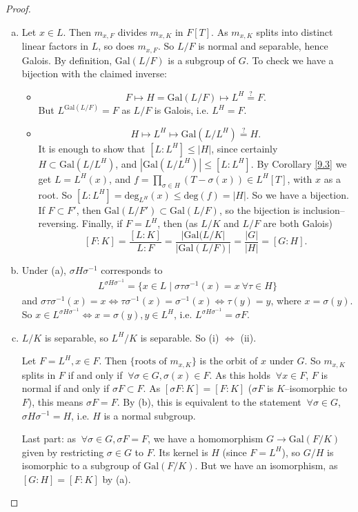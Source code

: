 \documentclass{article}
\theoremstyle{definition}
\begin{document}
\begin{proof}
    \begin{enumerate}[(a)]
        \item Let $x \in L$. Then $m_{x,F}$ divides $m_{x,K}$ in $F[T]$. As $m_{x,K}$ splits into distinct linear factors in $L$, so does $m_{x,F}$. So $L/F$ is normal and separable, hence Galois. By definition, $\text{Gal}(L/F)$ is a subgroup of $G$. To check we have a bijection with the claimed inverse:
        \begin{itemize}
            \item $$F \mapsto H = \text{Gal}(L/F) \mapsto L^H \stackrel{?}{=} F.$$
            But $L^{\text{Gal}(L/F)}=F$ as $L/F$ is Galois, i.e. $L^H = F$.
            \item $$H \mapsto L^H \mapsto \text{Gal}(L/L^H) \stackrel{?}{=} H.$$
            It is enough to show that $[L:L^H] \le |H|$, since certainly $H \subset \text{Gal}(L/L^H)$, and $|\text{Gal}(L/L^H)| \le [L : L^H]$. By Corollary \ref{9.3} we get $L=L^H(x)$, and $f = \prod_{\sigma \in H}^{} (T-\sigma(x)) \in L^H[T]$, with $x$ as a root. So $[L : L^H] = \text{deg}_{L^H}(x) \le \text{deg}(f) = |H|$. So we have a bijection. If $F \subset F'$, then $\text{Gal}(L/F') \subset \text{Gal}(L/F)$, so the bijection is inclusion--reversing. Finally, if $F=L^H$, then (as $L/K$ and $L/F$ are both Galois) \[
            [F:K] = \frac{[L:K]}{L:F} = \frac{|\text{Gal}(L/K|}{|\text{Gal}(L/F)|} = \frac{|G|}{|H|} = [G:H].
            \]
        \end{itemize}
        \item Under (a), $\sigma H \sigma^{-1}$ corresponds to 
        \begin{align*}
            L^{\sigma H \sigma^{-1}} = \{x \in L \mid \sigma \tau \sigma^{-1}(x)=x ~\forall \tau \in H\}
        \end{align*}
        and $\sigma \tau \sigma^{-1}(x)=x \iff \tau \sigma^{-1}(x) = \sigma^{-1}(x) \iff \tau(y)=y$, where ${x = \sigma(y)}$. So $x \in L^{\sigma H \sigma^{-1}} \iff x = \sigma(y), y \in L^H$, i.e. $L^{\sigma H \sigma^{-1}} = \sigma F$.
        \item $L/K$ is separable, so $L^H/K$ is separable. So (i) $\iff$ (ii).

        Let $F = L^H, x \in F$. Then $\{\text{roots of }m_{x,K}\}$ is the orbit of $x$ under $G$. So $m_{x,K}$ splits in $F$ if and only if $~\forall \sigma \in G, \sigma(x) \in F$. As this holds $~\forall x \in F$, $F$ is normal if and only if $\sigma F \subset F$. As $[\sigma F : K] = [F : K]$ ($\sigma F$ is $K$--isomorphic to $F$), this means $\sigma F = F$. By (b), this is equivalent to the statement $~\forall \sigma \in G$, $\sigma H \sigma^{-1} = H$, i.e. $H$ is a normal subgroup.
        \vspace{1mm}
        
        Last part: as $~\forall \sigma \in G, \sigma F = F$, we have a homomorphism $G \to \text{Gal}(F/K)$ given by restricting $\sigma \in G$ to $F$. Its kernel is $H$ (since $F = L^H$), so $G/H$ is isomorphic to a subgroup of $\text{Gal}(F/K)$. But we have an isomorphism, as $[G:H] = [F:K]$ by (a).
    \end{enumerate}
\end{proof}
\end{document}
